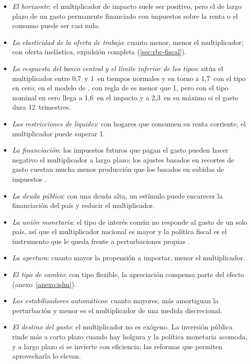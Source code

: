 \documentclass[11pt]{article}
\begin{document}
\begin{itemize}
\item \emph{El horizonte}: el multiplicador de impacto suele ser positivo, pero el de largo plazo de un gasto permanente financiado con impuestos sobre la renta o el consumo puede ser casi nulo.
\item \emph{La elasticidad de la oferta de trabajo}: cuanto menor, menor el multiplicador; con oferta inelástica, expulsión completa (\ref{sec:rbc-fiscal}).
\item \emph{La respuesta del banco central y el límite inferior de los tipos}: \textcite{Hall2009By} sitúa el multiplicador entre 0,7~y 1~en tiempos normales y en torno a 1,7~con el tipo en cero; en el modelo de \textcite{ChristianoEichenbaumRebelo2011}, con regla de  es menor que 1, pero con el tipo nominal en cero llega a 1,6~en el impacto y a 2,3~en su máximo si el gasto dura 12~trimestres.
\item \emph{Las restricciones de liquidez}: con hogares que consumen su renta corriente, el multiplicador puede superar 1\nocite{GaliLopezSalidoValles2007}.
\item \emph{La financiación}: los impuestos futuros que pagan el gasto pueden hacer negativo el multiplicador a largo plazo; los ajustes basados en recortes de gasto cuestan mucha menos producción que los basados en subidas de impuestos\nocite{AlesinaFaveroGiavazzi2019Austerity} .
\item \emph{La deuda pública}: con una deuda alta, un estímulo puede encarecer la financiación del país y reducir el multiplicador.
\item \emph{La unión monetaria}: el tipo de interés común no responde al gasto de un solo país, así que el multiplicador nacional es mayor y la política fiscal es el instrumento que le queda frente a perturbaciones propias\nocite{GaliMonacelli2008Optimal} .
\item \emph{La apertura}: cuanto mayor la propensión a importar, menor el multiplicador.
\item \emph{El tipo de cambio}: con tipo flexible, la apreciación compensa parte del efecto (anexo~\ref{anexo:islm}).
\item \emph{Los estabilizadores automáticos}: cuanto mayores, más amortiguan la perturbación y menor es el multiplicador de una medida discrecional.
\item \emph{El destino del gasto}: el multiplicador no es exógeno. La inversión pública rinde más a corto plazo cuando hay holgura y la política monetaria acomoda, y a largo plazo si se invierte con eficiencia\nocite{FMI2014Infrastructure}; las reformas que permiten aprovecharla lo elevan.
\end{itemize}
\end{document}
